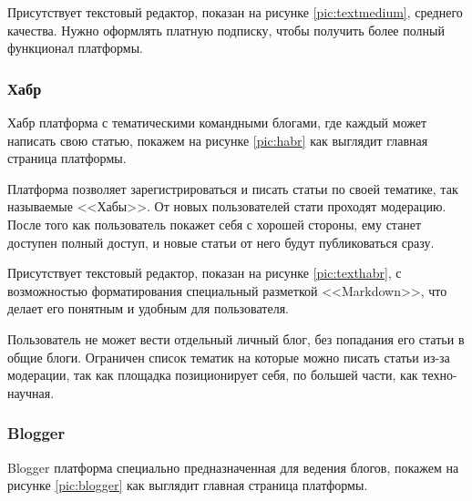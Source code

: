 
Присутствует текстовый редактор, показан на рисунке \ref{pic:textmedium}, среднего качества. Нужно оформлять платную подписку, чтобы получить более полный функционал платформы.


\subsubsection{Хабр}

Хабр платформа с тематическими командными блогами, где каждый может написать свою статью, покажем на рисунке \ref{pic:habr} как выглядит главная страница платформы.


Платформа позволяет зарегистрироваться и писать статьи по своей тематике, так называемые <<Хабы>>. От новых пользователей стати проходят модерацию. После того как пользователь покажет себя с хорошей стороны, ему станет доступен полный доступ, и новые статьи от него будут публиковаться сразу.

\pagebreak

Присутствует текстовый редактор, показан на рисунке \ref{pic:texthabr}, с возможностью форматирования специальный разметкой <<Markdown>>, что делает его понятным и удобным для пользователя.


Пользователь не может вести отдельный личный блог, без попадания его статьи в общие блоги. Ограничен список тематик на которые можно писать статьи из-за модерации, так как площадка позиционирует себя, по большей части, как техно-научная.

\pagebreak

\subsubsection{Blogger}

Blogger платформа специально предназначенная для ведения блогов, покажем на рисунке \ref{pic:blogger} как выглядит главная страница платформы.




\pagebreak